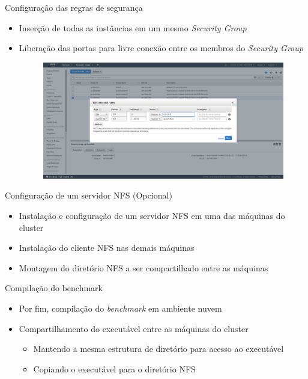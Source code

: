\documentclass{beamer}
\begin{document}
\begin{frame}{Configuração das regras de segurança}
	\begin{itemize}
		\item Inserção de todas as instâncias em um mesmo \textit{Security Group}
		\item Liberação das portas para livre conexão entre os membros do \textit{Security Group}
			\begin{figure}[ht]
		\begin{center}
 	 	  \includegraphics[scale=0.14]{figuras/securitygroup.png}	
		  \label{fig:fluxogramaAG}		
		\end{center}
	\end{figure}
	\end{itemize}
\end{frame}

\begin{frame}{Configuração de um servidor NFS (Opcional)}
	\begin{itemize}
		\item Instalação e configuração de um servidor NFS em uma das máquinas do cluster
		\item Instalação do cliente NFS nas demais máquinas
		\item Montagem do diretório NFS a ser compartilhado entre as máquinas
	\end{itemize}
\end{frame}

\begin{frame}{Compilação do benchmark}
	\begin{itemize}
		\item Por fim, compilação do \textit{benchmark} em ambiente nuvem
		\item Compartilhamento do executável entre as máquinas do cluster
		\begin{itemize}
			\item Mantendo a mesma estrutura de diretório para acesso ao executável
			\item Copiando  o executável para o diretório NFS
		\end{itemize}
	\end{itemize}
\end{frame}
\end{document}
